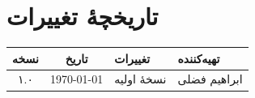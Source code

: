 \documentclass[12pt, a4paper]{article}
\begin{document}
\appendix
\section{تاریخچهٔ تغییرات}

\begin{center}
\begin{tabular}{|c|c|l|l|}
\hline
\textbf{نسخه} & \textbf{تاریخ} & \textbf{تغییرات} & \textbf{تهیه‌کننده} \\
\hline
۱.۰ & \today & نسخهٔ اولیه & ابراهیم فضلی \\
\hline
\end{tabular}
\end{center}
\end{document}
